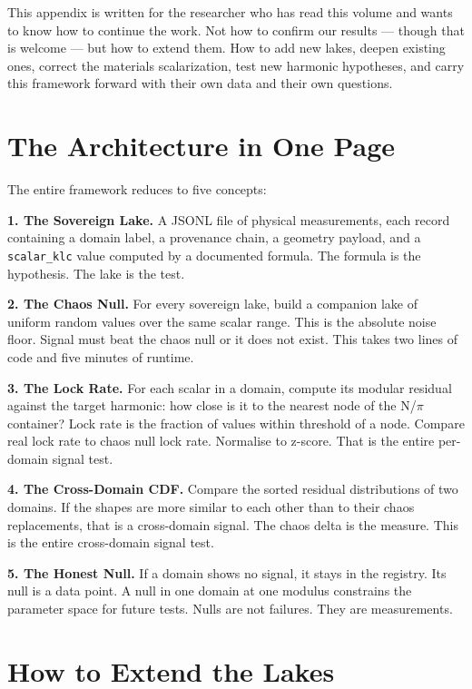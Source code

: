 \documentclass[11pt, letterpaper, openany]{book}
\begin{document}
This appendix is written for the researcher who has read this volume and wants to
know how to continue the work. Not how to confirm our results --- though that is
welcome --- but how to extend them. How to add new lakes, deepen existing ones,
correct the materials scalarization, test new harmonic hypotheses, and carry this
framework forward with their own data and their own questions.

\section*{The Architecture in One Page}

The entire framework reduces to five concepts:

\textbf{1. The Sovereign Lake.} A JSONL file of physical measurements, each record
containing a domain label, a provenance chain, a geometry payload, and a
\texttt{scalar\_klc} value computed by a documented formula. The formula is the
hypothesis. The lake is the test.

\textbf{2. The Chaos Null.} For every sovereign lake, build a companion lake of
uniform random values over the same scalar range. This is the absolute noise floor.
Signal must beat the chaos null or it does not exist. This takes two lines of code
and five minutes of runtime.

\textbf{3. The Lock Rate.} For each scalar in a domain, compute its modular residual
against the target harmonic: how close is it to the nearest node of the N/$\pi$
container? Lock rate is the fraction of values within threshold of a node. Compare
real lock rate to chaos null lock rate. Normalise to z-score. That is the entire
per-domain signal test.

\textbf{4. The Cross-Domain CDF.} Compare the sorted residual distributions of two
domains. If the shapes are more similar to each other than to their chaos replacements,
that is a cross-domain signal. The chaos delta is the measure. This is the entire
cross-domain signal test.

\textbf{5. The Honest Null.} If a domain shows no signal, it stays in the registry.
Its null is a data point. A null in one domain at one modulus constrains the parameter
space for future tests. Nulls are not failures. They are measurements.

\section*{How to Extend the Lakes}
\end{document}
